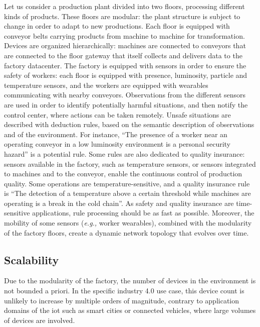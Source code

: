 \documentclass{iosart2c}
\begin{document}
Let us consider a production plant divided into two floors, processing different kinds of products. 
These floors are modular: the plant structure is subject to change in order to adapt to new productions.
Each floor is equipped with conveyor belts carrying products from machine to machine for transformation. 
Devices are organized hierarchically: machines are connected to conveyors that are connected to the floor gateway that itself collects and delivers data to the factory datacenter. 
The factory is equipped with sensors in order to ensure the safety of workers: each floor is equipped with presence, luminosity, particle and temperature sensors, and the workers are equipped with wearables communicating with nearby conveyors.
Observations from the different sensors are used in order to identify potentially harmful situations, and then notify the control center, where actions can be taken remotely.
Unsafe situations are described with deduction rules, based on the semantic description of observations and of the environment.
For instance, 
``The presence of a worker near an operating conveyor in a low luminosity environment is a personal security hazard'' is a potential rule.
Some rules are also dedicated to quality insurance: sensors available in the factory, such as temperature sensors, or sensors integrated to machines and to the conveyor, enable the continuous control of production quality.
Some operations are temperature-sensitive, and a quality insurance rule is ``The detection of a temperature above a certain threshold while machines are operating is a break in the cold chain''.
As safety and quality insurance are time-sensitive applications, rule processing should be as fast as possible.
Moreover, the mobility of some sensors (\textit{e.g.,} worker wearables), combined with the modularity of the factory floors, create a dynamic network topology that evolves over time.

\subsection{Scalability}

Due to the modularity of the factory, the number of devices in the environment is not bounded a priori. 
In the specific industry 4.0 use case, this device count is unlikely to increase by multiple orders of magnitude, contrary to application domains of the \gls{iot} such as smart cities or connected vehicles, where large volumes of devices are involved.
\end{document}
